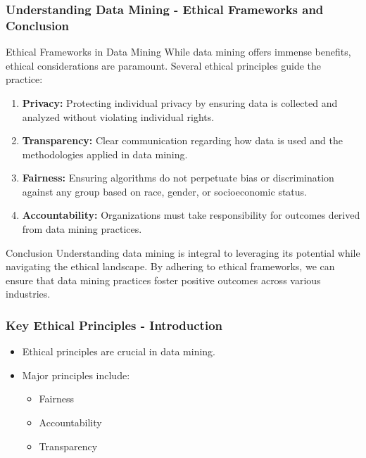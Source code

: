 \documentclass[aspectratio=169]{beamer}
\begin{document}
\begin{frame}[fragile]
    \frametitle{Understanding Data Mining - Ethical Frameworks and Conclusion}
    \begin{block}{Ethical Frameworks in Data Mining}
        While data mining offers immense benefits, ethical considerations are paramount. Several ethical principles guide the practice:
    \end{block}
    
    \begin{enumerate}
        \item \textbf{Privacy:} Protecting individual privacy by ensuring data is collected and analyzed without violating individual rights.
        \item \textbf{Transparency:} Clear communication regarding how data is used and the methodologies applied in data mining.
        \item \textbf{Fairness:} Ensuring algorithms do not perpetuate bias or discrimination against any group based on race, gender, or socioeconomic status.
        \item \textbf{Accountability:} Organizations must take responsibility for outcomes derived from data mining practices.
    \end{enumerate}
    
    \begin{block}{Conclusion}
        Understanding data mining is integral to leveraging its potential while navigating the ethical landscape. By adhering to ethical frameworks, we can ensure that data mining practices foster positive outcomes across various industries.
    \end{block}
\end{frame}

\begin{frame}[fragile]
    \frametitle{Key Ethical Principles - Introduction}
    \begin{itemize}
        \item Ethical principles are crucial in data mining.
        \item Major principles include:
        \begin{itemize}
            \item Fairness
            \item Accountability
            \item Transparency
        \end{itemize}
    \end{itemize}
\end{frame}
\end{document}
